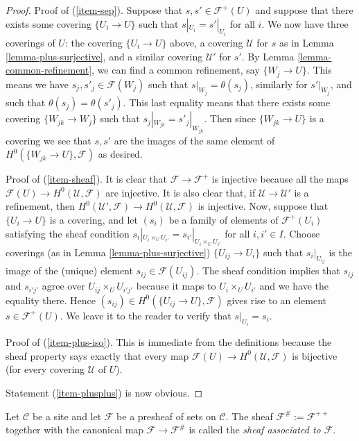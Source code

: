 \begin{proof}
Proof of (\ref{item-sep}).
Suppose that $s, s' \in \mathcal{F}^+(U)$ and suppose that
there exists some covering $\{U_i \to U\}$ such that
$s|_{U_i} = s'|_{U_i}$ for all $i$. We now have three coverings
of $U$: the covering $\{U_i \to U\}$ above, a covering $\mathcal{U}$
for $s$ as in Lemma \ref{lemma-plus-surjective},
and a similar covering $\mathcal{U}'$ for $s'$. By Lemma
\ref{lemma-common-refinement}, we can find a common refinement,
say $\{W_j \to U\}$. This means we have $s_j, s'_j \in \mathcal{F}(W_j)$
such that $s|_{W_j} = \theta(s_j)$, similarly for $s'|_{W_j}$, and
such that $\theta(s_j) = \theta(s'_j)$. This last equality means
that there exists some covering $\{W_{jk} \to W_j\}$ such that
$s_j|_{W_{jk}} = s'_j|_{W_{jk}}$. Then since $\{W_{jk} \to U\}$
is a covering we see that $s, s'$ are the images of the same element of
$H^0(\{W_{jk} \to U\}, \mathcal{F})$ as desired.

\medskip\noindent
Proof of (\ref{item-sheaf}). It is clear that $\mathcal{F} \to
\mathcal{F}^+$ is injective because all the maps
$\mathcal{F}(U) \to H^0(\mathcal{U}, \mathcal{F})$
are injective. It is also clear that, if $\mathcal{U} \to
\mathcal{U}'$ is a refinement, then $H^0(\mathcal{U}', \mathcal{F})
\to H^0(\mathcal{U}, \mathcal{F})$ is injective. Now,
suppose that $\{U_i \to U\}$ is a covering, and let
$(s_i)$ be a family of elements of $\mathcal{F}^+(U_i)$
satisfying the sheaf condition
$s_i|_{U_i \times_U U_{i'}} = s_{i'}|_{U_i \times_U U_{i'}}$
for all $i, i' \in I$. Choose coverings (as in
Lemma \ref{lemma-plus-surjective}) $\{U_{ij} \to U_i\}$
such that $s_i|_{U_{ij}}$ is the image of the (unique)
element $s_{ij} \in \mathcal{F}(U_{ij})$. The sheaf condition
implies that $s_{ij}$ and $s_{i'j'}$ agree over
$U_{ij} \times_U U_{i'j'}$ because it maps to
$U_i \times_U U_{i'}$ and we have the equality there.
Hence $(s_{ij}) \in H^0(\{U_{ij} \to U\}, \mathcal{F})$
gives rise to an element $s \in \mathcal{F}^+(U)$. We leave
it to the reader to verify that $s|_{U_i} = s_i$.

\medskip\noindent
Proof of (\ref{item-plus-iso}). This is immediate from the definitions
because the sheaf property says exactly that every map
$\mathcal{F}(U) \to H^0(\mathcal{U}, \mathcal{F})$ is bijective
(for every covering $\mathcal{U}$ of $U$).

\medskip\noindent
Statement (\ref{item-plusplus}) is now obvious.
\end{proof}

\begin{definition}
\label{definition-associated-sheaf}
Let $\mathcal{C}$ be a site and let $\mathcal{F}$ be a presheaf
of sets on $\mathcal{C}$. The sheaf $\mathcal{F}^\# := \mathcal{F}^{++}$
together with the canonical map $\mathcal{F} \to \mathcal{F}^\#$
is called the {\it sheaf associated to $\mathcal{F}$}.
\end{definition}

